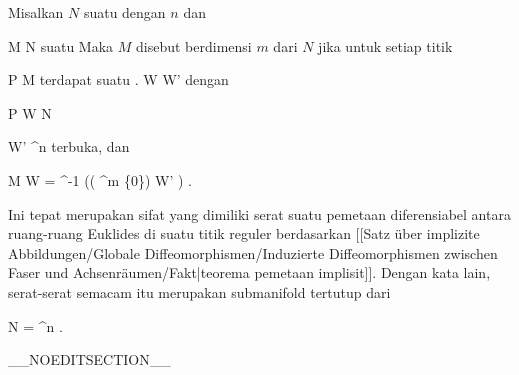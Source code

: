 \setcounter{section}{10}


{}
{

Misalkan $N$ suatu
dengan
$n$ dan

\mavergleichskette
{\vergleichskette
{ M
}
{ \subseteq }{ N
}
{  }{
}
{    }{
}
{   }{
}
}
{}{}{}
suatu
Maka $M$ disebut  berdimensi $m$ dari $N$ jika untuk setiap titik

\mavergleichskette
{\vergleichskette
{ P
}
{ \in }{ M
}
{  }{
}
{    }{
}
{   }{
}
}
{}{}{}
terdapat suatu
 {.} {}
\maabbdisp {\theta} { W } { W'
} {}
dengan

\mavergleichskette
{\vergleichskette
{ P
}
{ \in }{ W
}
{ \subseteq }{ N
}
{    }{
}
{   }{
}
}
{}{}{}

\mavergleichskette
{\vergleichskette
{ W'
}
{ \subseteq }{ \R^n
}
{  }{
}
{    }{
}
{   }{
}
}
{}{}{}
terbuka, dan

\mavergleichskettedisp
{\vergleichskette
{ M \cap W
}
{ =} { \theta^{-1} (( \R^m  \times\{0\}) \cap W' )
}
{ } {
}
{ } {
}
{ } {
}
}
{}{}{.}

}

Ini tepat merupakan sifat yang dimiliki serat suatu pemetaan diferensiabel antara ruang-ruang Euklides di suatu titik reguler berdasarkan
[[Satz über implizite Abbildungen/Globale Diffeomorphismen/Induzierte Diffeomorphismen zwischen Faser und Achsenräumen/Fakt|teorema pemetaan implisit]].
Dengan kata lain, serat-serat semacam itu merupakan submanifold tertutup dari

\mavergleichskette
{\vergleichskette
{ N
}
{ = }{ \R^n
}
{  }{
}
{    }{
}
{   }{
}
}
{}{}{.}

__NOEDITSECTION__

